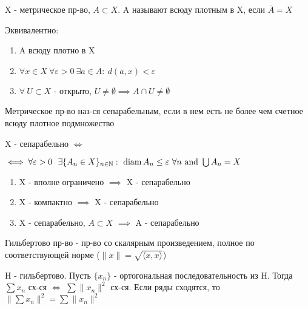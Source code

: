 \documentclass[a4paper,12pt]{article}
\begin{document}
\begin{definition*}
X - метрическое пр-во, $A \subset X$. A называют всюду плотным в X, если $\overline{A} = X$
\end{definition*}

\begin{claim*}
Эквивалентно:
\begin{enumerate}
    \item A всюду плотно в X
    \item $\forall x \in X \ \forall \varepsilon > 0 \ \exists a \in A : \ d(a, x) < \varepsilon$
    \item $\forall \ U \subset X$ - открыто, $U \neq \emptyset \implies A \cap U \neq \emptyset$
\end{enumerate}
\end{claim*}

\begin{definition*}[Сепарабельность]
Метрическое пр-во наз-ся сепарабельным, если в нем есть не более чем счетное всюду плотное подмножество
\end{definition*}

\begin{claim*}
X - сепарабельно $\iff$

$ \iff \forall \varepsilon > 0 \ \ \exists \{A_n \in X\}_{n \in \mathbb{N}} : \ \Diam{A_n} \le \varepsilon \ \forall n \ \text{and} \ \bigcup A_n = X$
\end{claim*}

\begin{corollary*}
\begin{enumerate}
    \item X - вполне ограничено $\implies$ X - сепарабельно
    \item X - компактно $\implies$ X - сепарабельно
    \item X - сепарабельно, $A \subset X$ $\implies$ A - сепарабельно
\end{enumerate}
\end{corollary*}

\begin{definition*}[Гильбертово пр-во]
Гильбертово пр-во - пр-во со скалярным произведением, полное по соответствующей норме ($\|x\| = \sqrt{\langle x, x \rangle}$)
\end{definition*}

\begin{claim*}
H - гильбертово. Пусть $\{x_n\}$ - ортогональная последовательность из H. Тогда $\sum x_n$ сх-ся $\iff$ $\sum \|x_n\|^2$ сх-ся. Если ряды сходятся, то $\| \sum x_n \|^2 = \sum \|x_n\|^2$
\end{claim*}
\end{document}
